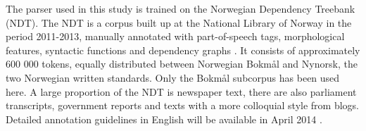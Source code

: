 \documentclass[11pt]{article}
\begin{document}
The parser used in this study is trained on the Norwegian Dependency Treebank (NDT). The NDT is a corpus built up at the National Library of Norway in the period 2011-2013, manually annotated with part-of-speech tags, morphological features, syntactic functions and dependency graphs \cite{Sol14, Sol13}. It consists of approximately 600 000 tokens, equally distributed between Norwegian Bokmål and Nynorsk, the two Norwegian written standards. Only the Bokmål subcorpus has been used here. A large proportion of the NDT is newspaper text, there are also parliament transcripts, government reports and texts with a more colloquial style from blogs. Detailed annotation guidelines in English will be available in April 2014 \cite{Kinn2013}.





\end{document}
